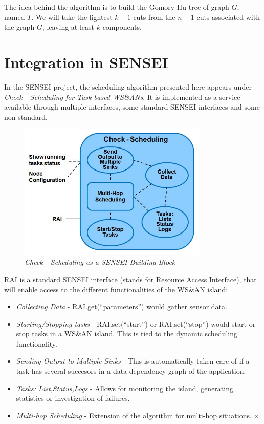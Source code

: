 The idea behind the algorithm is to build the Gomory-Hu tree of graph $G$, named $T$. We will take the 
lightest $k-1$ cuts from the $n-1$ cuts associated with the graph $G$, leaving at least $k$ components.

\section{Integration in SENSEI}

In the SENSEI project, the scheduling algorithm presented here appears under \textit{Check - Scheduling for Task-based WS\&ANs}. It is
implemented as a service available through multiple interfaces, some standard SENSEI interfaces and some non-standard. 

\begin{figure}[ht]
\begin{center}
 \includegraphics[width=90mm]{static/check.png}
\end{center}
\caption{\small \itshape{Check - Scheduling as a SENSEI Building Block}}
\end{figure}

RAI is a standard SENSEI interface (stands for Resource Access Interface), that will enable access to the different functionalities 
of the WS\&AN island:
\begin{itemize}
\item \textit{Collecting Data} - RAI.get(``parameters'') would gather sensor data.
\item \textit{Starting/Stopping tasks} - RAI.set(``start'') or RAI.set(``stop'') would start or stop tasks in a WS\&AN island. This is tied to
the dynamic scheduling functionality.
\item \textit{Sending Output to Multiple Sinks} - This is automatically taken care of if a task has several succesors in a data-dependency
graph of the application.
\item \textit{Tasks: List,Status,Logs} - Allows for monitoring the island, generating statistics or investigation of failures.
\item \textit{Multi-hop Scheduling} - Extension of the algorithm for multi-hop situations.
 ×
\end{itemize}

